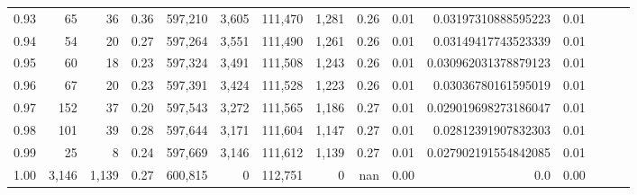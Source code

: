 \begin{tabular}{rrrrrrrrrrrrrrr}
0.93 &      65 &     36 &  0.36 &  597,210 &    3,605 &  111,470 &    1,281 &  0.26 &  0.01 &   0.03197310888595223 &      0.01 \\
0.94 &      54 &     20 &  0.27 &  597,264 &    3,551 &  111,490 &    1,261 &  0.26 &  0.01 &   0.03149417743523339 &      0.01 \\
0.95 &      60 &     18 &  0.23 &  597,324 &    3,491 &  111,508 &    1,243 &  0.26 &  0.01 &  0.030962031378879123 &      0.01 \\
0.96 &      67 &     20 &  0.23 &  597,391 &    3,424 &  111,528 &    1,223 &  0.26 &  0.01 &   0.03036780161595019 &      0.01 \\
0.97 &     152 &     37 &  0.20 &  597,543 &    3,272 &  111,565 &    1,186 &  0.27 &  0.01 &  0.029019698273186047 &      0.01 \\
0.98 &     101 &     39 &  0.28 &  597,644 &    3,171 &  111,604 &    1,147 &  0.27 &  0.01 &   0.02812391907832303 &      0.01 \\
0.99 &      25 &      8 &  0.24 &  597,669 &    3,146 &  111,612 &    1,139 &  0.27 &  0.01 &  0.027902191554842085 &      0.01 \\
1.00 &   3,146 &  1,139 &  0.27 &  600,815 &        0 &  112,751 &        0 &   nan &  0.00 &                   0.0 &      0.00 \\
\bottomrule
\end{tabular}
